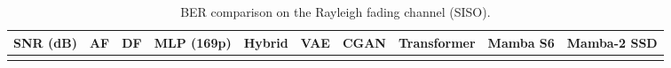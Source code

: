 \documentclass[
  english,
  12pt,
  12pt,
  a4paper,
  oneside]{report}
\begin{document}
\begin{longtable}[]{@{}
  >{\raggedright\arraybackslash}p{}
  >{\raggedright\arraybackslash}p{}
  >{\raggedright\arraybackslash}p{}
  >{\raggedright\arraybackslash}p{}
  >{\raggedright\arraybackslash}p{}
  >{\raggedright\arraybackslash}p{}
  >{\raggedright\arraybackslash}p{}
  >{\raggedright\arraybackslash}p{}
  >{\raggedright\arraybackslash}p{}
  >{\raggedright\arraybackslash}p{}@{}}
\caption{BER comparison on the Rayleigh fading channel (SISO).}\label{tbl:table2}\tabularnewline
\toprule\noalign{}
\begin{minipage}[b]{\linewidth}\raggedright
SNR (dB)
\end{minipage} & \begin{minipage}[b]{\linewidth}\raggedright
AF
\end{minipage} & \begin{minipage}[b]{\linewidth}\raggedright
DF
\end{minipage} & \begin{minipage}[b]{\linewidth}\raggedright
MLP (169p)
\end{minipage} & \begin{minipage}[b]{\linewidth}\raggedright
Hybrid
\end{minipage} & \begin{minipage}[b]{\linewidth}\raggedright
VAE
\end{minipage} & \begin{minipage}[b]{\linewidth}\raggedright
CGAN
\end{minipage} & \begin{minipage}[b]{\linewidth}\raggedright
Transformer
\end{minipage} & \begin{minipage}[b]{\linewidth}\raggedright
Mamba S6
\end{minipage} & \begin{minipage}[b]{\linewidth}\raggedright
Mamba-2 SSD
\end{minipage} \\
\midrule\noalign{}
\endfirsthead
\toprule\noalign{}
\begin{minipage}[b]{\linewidth}\raggedright

\end{minipage}
\end{longtable}
\end{document}
